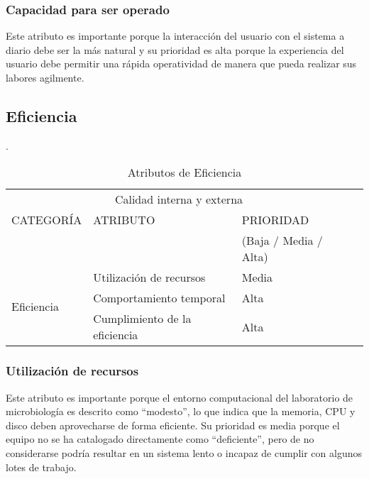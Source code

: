 \documentclass[12pt]{article}
\begin{document}
\subsubsection{Capacidad para ser operado}
\vspace*{0.2in}
Este atributo es importante porque la interacción del usuario con el sistema a diario debe ser la más natural y su prioridad es alta porque la experiencia del usuario debe permitir una rápida operatividad de manera que pueda realizar sus labores agilmente.\\[6 cm]

\vspace*{0.3in}

\subsection{Eficiencia}.\\[0.1 cm]

\begin{table}[htb]%
\centering
\begin{tabular}{|l|l|l|l|}
\hline
\multicolumn{3}{|c|}{Calidad interna y externa   } \\
\cline{1-3}
CATEGORÍA & ATRIBUTO & PRIORIDAD\\ & & (Baja / Media / Alta)\\
\hline \hline
\multirow{3}{3cm}{Eficiencia} & Utilización de recursos & Media \\ \cline{2-3}
& Comportamiento temporal &  Alta\\ \cline{2-3}
& Cumplimiento de la eficiencia & Alta\\ \cline{1-3}
\end{tabular}
\caption{Atributos de Eficiencia}
\label{tabla:final}
\end{table}%
\subsubsection{ Utilización de recursos}
\vspace*{0.2in}
Este atributo es importante porque el entorno computacional del laboratorio de microbiología es descrito como “modesto”, lo que indica que la memoria, CPU y disco deben aprovecharse de forma eficiente. Su prioridad es media porque el equipo no se ha catalogado directamente como “deficiente”, pero de no considerarse podría resultar en un sistema lento o incapaz de cumplir con algunos lotes de trabajo.
\end{document}
